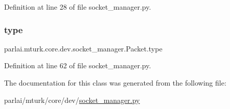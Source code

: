 Definition at line 28 of file socket\+\_\+manager.\+py.

\mbox{\label{classparlai_1_1mturk_1_1core_1_1dev_1_1socket__manager_1_1Packet_acc5963f125182087b623a3adde523c89}} 
\subsubsection{\texorpdfstring{type}{type}}
{\footnotesize\ttfamily parlai.\+mturk.\+core.\+dev.\+socket\+\_\+manager.\+Packet.\+type}



Definition at line 62 of file socket\+\_\+manager.\+py.



The documentation for this class was generated from the following file\+:\begin{DoxyCompactItemize}
\item 
parlai/mturk/core/dev/\hyperlink{dev_2socket__manager_8py}{socket\+\_\+manager.\+py}\end{DoxyCompactItemize}
